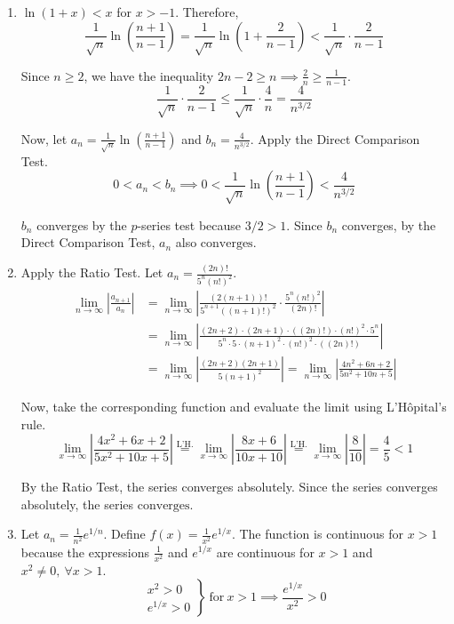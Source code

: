 \documentclass[a4paper, 12pt]{article}
\begin{document}
\begin{enumerate}[leftmargin=*,label=\textbf{\arabic*.}]
\begin{enumerate}[leftmargin=*,label=\textbf{\alph*.}]
Since the integral diverges, the series also $\boxed{\text{diverges}}$.

\item $\ln(1+x)<x$ for $x>-1$. Therefore,
\[\frac1{\sqrt n}\ln\left(\frac{n+1}{n-1}\right)=\frac1{\sqrt n}\ln\left(1+\frac2{n-1}\right)<\frac1{\sqrt n}\cdot\frac2{n-1}\]

Since $n\geq2$, we have the inequality $\displaystyle 2n-2\geq n\implies\frac2n\geq\frac1{n-1}$.
\[\frac1{\sqrt n}\cdot\frac2{n-1}\leq\frac1{\sqrt n}\cdot\frac4n=\frac4{n^{3/2}}\]

Now, let $\displaystyle a_n=\frac1{\sqrt n}\ln\left(\frac{n+1}{n-1}\right)$ and $\displaystyle b_n=\frac4{n^{3/2}}$. Apply the Direct Comparison Test.
\[0<a_n<b_n\implies0<\frac1{\sqrt n}\ln\left(\frac{n+1}{n-1}\right)<\frac4{n^{3/2}}\]

$b_n$ converges by the $p$-series test because $3/2>1$. Since $b_n$ converges, by the Direct Comparison Test, $a_n$ also $\boxed{\text{converges}}$.

\item Apply the Ratio Test. Let $\displaystyle a_n=\frac{(2n)!}{5^n\left(n!\right)^2}$.
\begin{align*}\lim_{n\to\infty}\left|\frac{a_{n+1}}{a_n}\right|&=\lim_{n\to\infty}\left|\frac{(2(n+1))!}{5^{n+1}\left((n+1)!\right)^2}\cdot\frac{5^n\left(n!\right)^2}{(2n)!}\right|\\[1em]&=\lim_{n\to\infty}\left|\frac{(2n+2)\cdot(2n+1)\cdot((2n)!)\cdot(n!)^2\cdot5^n}{5^n\cdot5\cdot(n+1)^2\cdot(n!)^2\cdot((2n)!)}\right|\\[1em]&=\lim_{n\to\infty}\left|\frac{(2n+2)(2n+1)}{5(n+1)^2}\right|=\lim_{n\to\infty}\left|\frac{4n^2+6n+2}{5n^2+10n+5}\right|\end{align*}

Now, take the corresponding function and evaluate the limit using L'Hôpital's rule.
\[\lim_{x\to\infty}\left|\frac{4x^2+6x+2}{5x^2+10x+5}\right|\overset{\text{L'H.}}{=}\lim_{x\to\infty}\left|\frac{8x+6}{10x+10}\right|\overset{\text{L'H.}}{=}\lim_{x\to\infty}\left|\frac{8}{10}\right|=\frac45<1\]

By the Ratio Test, the series converges absolutely. Since the series converges absolutely, the series $\boxed{\text{converges}}$.

\item Let $\displaystyle a_n=\frac1{n^2} e^{1/n}$. Define $\displaystyle f(x)=\frac1{x^2} e^{1/x}$. The function is continuous for $x>1$ because the expressions $\displaystyle\frac1{x^2}$ and $ e^{1/x}$ are continuous for $x>1$ and $x^2\neq0,\:\forall x>1$.
\[\left.\begin{array}{c}
x^2>0\\
 e^{1/x}>0
\end{array}\right\}\:\text{for}\:x>1\implies\frac{ e^{1/x}}{x^2}>0\]


\end{enumerate}
\end{enumerate}
\end{document}
